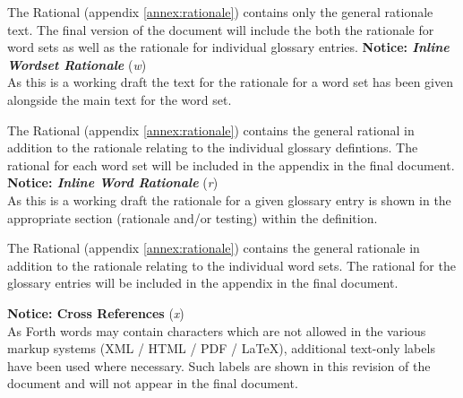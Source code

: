 \begin{titlepage}
The Rational (appendix \ref{annex:rationale}) contains only the general
rationale text. The final version of the document will include the both
the rationale for word sets as well as the rationale for individual
glossary entries.
		\else
\textbf{Notice: \emph{Inline Wordset Rationale}} (\textit{w}) \\
As this is a working draft the text for the rationale for a word set
has been given alongside the main text for the word set.

The Rational (appendix \ref{annex:rationale}) contains the general
rational in addition to the rationale relating to the individual
glossary defintions.
The rational for each word set will be included in the appendix in the
final document.
		\fi
	\else
		\ifinlinebody
\textbf{Notice: \emph{Inline Word Rationale}} (\textit{r}) \\
As this is a working draft the rationale for a given glossary entry is
shown in the appropriate section (rationale and/or testing) within the
definition.

The Rational (appendix \ref{annex:rationale}) contains the general
rationale in addition to the rationale relating to the individual word
sets.
The rational for the glossary entries will be included in the appendix
in the final document.
		\fi
	\fi
\fi


\ifshowref
\textbf{Notice: Cross References} (\textit{x}) \\
As Forth words may contain characters which are not allowed in the
various markup systems (XML / HTML / PDF / \LaTeX), additional
text-only labels have been used where necessary. Such labels are
shown in this revision of the document and will not appear in the
final document.
\fi
\end{titlepage}
